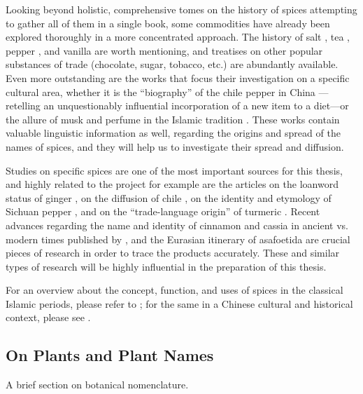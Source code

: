 Looking beyond holistic, comprehensive tomes on the history of spices attempting to gather all of them in a single book, some commodities have already been explored thoroughly in a more concentrated approach. The history of salt \autocite{kurlansky_salt_2002}, tea \autocite{mair_true_2009}, pepper \autocite{shaffer_pepper_2013}, and vanilla \autocite{rain_vanilla_2004} are worth mentioning, and treatises on other popular substances of trade (chocolate, sugar, tobacco, etc.) are abundantly available. Even more outstanding are the works that focus their investigation on a specific cultural area, whether it is the ``biography'' of the chile pepper in China \autocite{dott_chile_2020}---retelling an unquestionably influential incorporation of a new item to a diet---or the allure of musk and perfume in the Islamic tradition \autocite{king_musk_2007}. These works contain valuable linguistic information as well, regarding the origins and spread of the names of spices, and they will help us to investigate their spread and diffusion. 

Studies on specific spices are one of the most important sources for this thesis, and highly related to the project for example are the articles on the loanword status of ginger \autocite{ross_ginger_1952}, on the diffusion of chile \autocite{wright_medieval_2007}, on the identity and etymology of Sichuan pepper \autocite{austin_sichuan_2008}, and on the ``trade-language origin'' of turmeric \autocite{guthrie_trade-language_2009}. Recent advances regarding the name and identity of cinnamon and cassia in ancient vs. modern times published by \textcite{haw_cinnamon_2017}, and the Eurasian itinerary of asafoetida \autocite{leung_itinerary_2019} are crucial pieces of research in order to trace the products accurately. These and similar types of research will be highly influential in the preparation of this thesis.

For an overview about the concept, function, and uses of spices in the classical Islamic periods, please refer to \textcite{dietrich_afawih_2004}; for the same in a Chinese cultural and historical context, please see \textcite[147-153]{hu_food_2005}.

\subsection{On Plants and Plant Names}

A brief section on botanical nomenclature.


